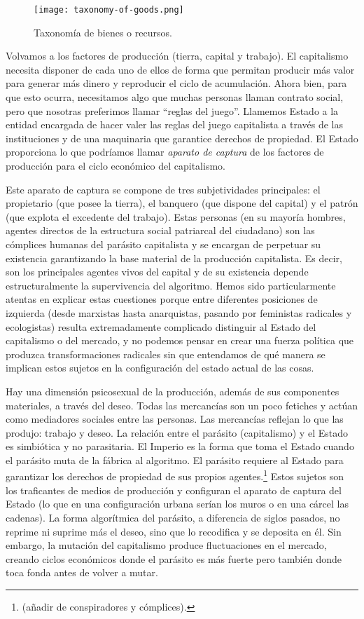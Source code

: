 \begin{figure}[htbp]
	\centering
	\texttt{[image: taxonomy-of-goods.png]}
	\caption{Taxonomía de bienes o recursos.}
	\label{fig:taxres}
\end{figure}

Volvamos a los factores de producción (tierra, capital y trabajo). El capitalismo necesita disponer de cada uno de ellos de forma que permitan producir más valor para generar más dinero y reproducir el ciclo de acumulación. Ahora bien, para que esto ocurra, necesitamos algo que muchas personas llaman contrato social, pero que nosotras preferimos llamar \enquote{reglas del juego}. Llamemos Estado a la entidad encargada de hacer valer las reglas del juego capitalista a través de las instituciones y de una maquinaria que garantice derechos de propiedad. El Estado proporciona lo que podríamos llamar \emph{aparato de captura} de los factores de producción para el ciclo económico del capitalismo.

Este aparato de captura se compone de tres subjetividades principales: el propietario (que posee la tierra), el banquero (que dispone del capital) y el patrón (que explota el excedente del trabajo). Estas personas (en su mayoría hombres, agentes directos de la estructura social patriarcal del ciudadano) son las cómplices humanas del parásito capitalista y se encargan de perpetuar su existencia garantizando la base material de la producción capitalista. Es decir, son los principales agentes vivos del capital y de su existencia depende estructuralmente la supervivencia del algoritmo. Hemos sido particularmente atentas en explicar estas cuestiones porque entre diferentes posiciones de izquierda (desde marxistas hasta anarquistas, pasando por feministas radicales y ecologistas) resulta extremadamente complicado distinguir al Estado del capitalismo o del mercado, y no podemos pensar en crear una fuerza política que produzca transformaciones radicales sin que entendamos de qué manera se implican estos sujetos en la configuración del estado actual de las cosas.

Hay una dimensión psicosexual de la producción, además de sus componentes materiales, a través del deseo. Todas las mercancías son un poco fetiches y actúan como mediadores sociales entre las personas. Las mercancías reflejan lo que las produjo: trabajo y deseo. La relación entre el parásito (capitalismo) y el Estado es simbiótica y no parasitaria. El Imperio es la forma que toma el Estado cuando el parásito muta de la fábrica al algoritmo. El parásito requiere al Estado para garantizar los derechos de propiedad de sus propios agentes.\footnote{(añadir de conspiradores y cómplices).} Estos sujetos son los traficantes de medios de producción y configuran el aparato de captura del Estado (lo que en una configuración urbana serían los muros o en una cárcel las cadenas). La forma algorítmica del parásito, a diferencia de siglos pasados, no reprime ni suprime más el deseo, sino que lo recodifica y se deposita en él. Sin embargo, la mutación del capitalismo produce fluctuaciones en el mercado, creando ciclos económicos donde el parásito es más fuerte pero también donde toca fonda antes de volver a mutar.

